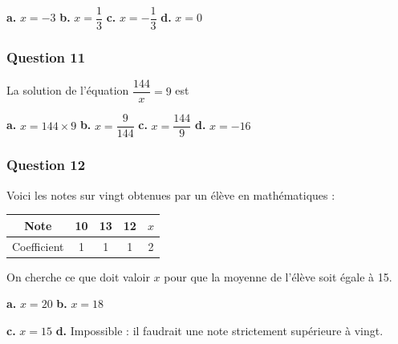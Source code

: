 \documentclass[10pt]{article}
\begin{document}
\textbf{a.} $x = -3$ \hfill \textbf{b.} $x = \dfrac{1}{3}$ \hfill \textbf{c.} $x = -\dfrac{1}{3}$ \hfill \textbf{d.} $x = 0$

\subsubsection*{Question 11}
La solution de l'équation $\dfrac{144}{x} = 9$ est

\textbf{a.} $x = 144 \times 9$ \hfill \textbf{b.} $x = \dfrac{9}{144}$ \hfill \textbf{c.} $x = \dfrac{144}{9}$ \hfill \textbf{d.} $x = -16$

\subsubsection*{Question 12}
Voici les notes sur vingt obtenues par un élève en mathématiques :

\begin{center}
\begin{tabular}{|c|c|c|c|c|}
\hline
Note & 10 & 13 & 12 & $x$ \\
\hline
Coefficient & 1 & 1 & 1 & 2 \\
\hline
\end{tabular}
\end{center}

On cherche ce que doit valoir $x$ pour que la moyenne de l'élève soit égale à 15.

\textbf{a.} $x = 20$ \hfill \textbf{b.} $x = 18$

\textbf{c.} $x = 15$ \hfill \textbf{d.} Impossible : il faudrait une note strictement supérieure à vingt.
\end{document}
